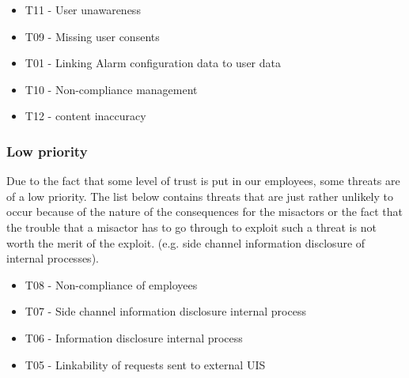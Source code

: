 \begin{itemize}
\item T11 - User unawareness
\item T09 - Missing user consents

\item T01 - Linking Alarm configuration data to user data
\item T10 - Non-compliance management
\item T12 - content inaccuracy
\end{itemize}

\subsubsection{Low priority}
Due to the fact that some level of trust is put in our employees, some threats are of a low priority. The list below contains
threats that are just rather unlikely to occur because of the nature of the consequences for the misactors or the fact
that the trouble that a misactor has to go through to exploit such a threat is not worth the merit of the exploit. (e.g.
side channel information disclosure of internal processes).





\begin{itemize}
\item T08 - Non-compliance of employees
\item T07 - Side channel information disclosure internal process
\item T06 - Information disclosure internal process
\item T05 - Linkability of requests sent to external UIS
\end{itemize}
